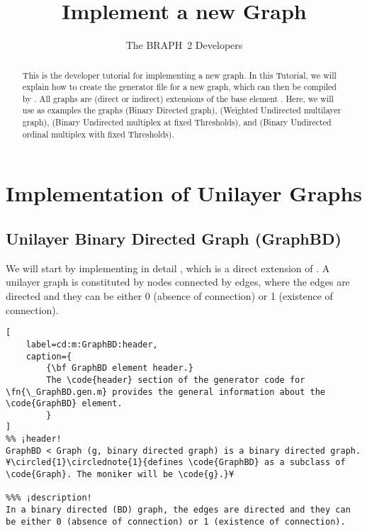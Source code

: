 \documentclass{tufte-handout}
\title{Implement a new Graph}
\author[The BRAPH~2 Developers]{The BRAPH~2 Developers}
\begin{document}
\maketitle

\begin{abstract}
\noindent
This is the developer tutorial for implementing a new graph. 
In this Tutorial, we will explain how to create the generator file  for a new graph, which can then be compiled by . All graphs are (direct or indirect) extensions of the base element . Here, we will use as examples the graphs  (Binary Directed graph),  (Weighted Undirected multilayer graph),  (Binary Undirected multiplex at fixed Thresholds), and  (Binary Undirected ordinal multiplex with fixed Thresholds).
\end{abstract}

\tableofcontents

\clearpage
\section{Implementation of Unilayer Graphs}

\subsection{Unilayer Binary Directed Graph (GraphBD)}

We will start by implementing in detail , which  is a direct extension of  .
A unilayer graph is constituted by nodes connected by edges, where the edges are directed and they can be either 0 (absence of connection) or 1 (existence of connection).

\begin{lstlisting}[
	label=cd:m:GraphBD:header,
	caption={
		{\bf GraphBD element header.}
		The \code{header} section of the generator code for \fn{\_GraphBD.gen.m} provides the general information about the \code{GraphBD} element.
		}
]
%% ¡header!
GraphBD < Graph (g, binary directed graph) is a binary directed graph. ¥\circled{1}\circlednote{1}{defines \code{GraphBD} as a subclass of \code{Graph}. The moniker will be \code{g}.}¥

%%% ¡description!
In a binary directed (BD) graph, the edges are directed and they can be either 0 (absence of connection) or 1 (existence of connection).
\end{lstlisting}
\end{document}
